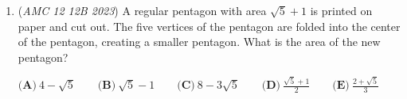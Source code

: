 \begin{enumerate}
 \[\text{lcm}(a,b)=2^3\cdot 3^2\cdot 5^3\]

 \[\text{lcm}(a,c)=2^3\cdot 3^3\cdot 5^3\]

 \[\text{lcm}(a,d)=2^3\cdot 3^3\cdot 5^3\]

 \[\text{lcm}(b,c)=2^1\cdot 3^3\cdot 5^2\]

 \[\text{lcm}(b,d)=2^2\cdot 3^3\cdot 5^2\]

 \[\text{lcm}(c,d)=2^2\cdot 3^3\cdot 5^2\]


 What is $\text{gcd}(a,b,c,d)$?


 $\textbf{(A)}~30\qquad\textbf{(B)}~45\qquad\textbf{(C)}~3\qquad\textbf{(D)}~15\qquad\textbf{(E)}~6$


	\item (\textit{AMC 12 12B 2023}) A regular pentagon with area $\sqrt{5}+1$ is printed on paper and cut out. The five vertices of the pentagon are folded into the center of the pentagon, creating a smaller pentagon. What is the area of the new pentagon?


 $\textbf{(A)}~4-\sqrt{5}\qquad\textbf{(B)}~\sqrt{5}-1\qquad\textbf{(C)}~8-3\sqrt{5}\qquad\textbf{(D)}~\frac{\sqrt{5}+1}{2}\qquad\textbf{(E)}~\frac{2+\sqrt{5}}{3}$


\end{enumerate}